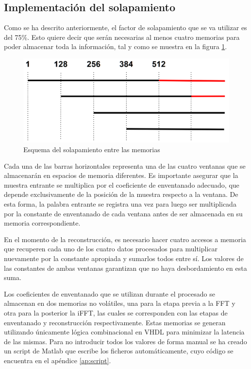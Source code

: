 \subsection{Implementación del solapamiento}
Como se ha descrito anteriormente, el factor de solapamiento que se va utilizar es del 75\%. Esto quiere decir que serán necesarias al menos cuatro memorias para poder almacenar toda la información, tal y como se muestra en la figura \ref{fig:solap}. 

\begin{figure}[!b]
\begin{center}
\includegraphics[width=13cm]{img/solap.png}
\caption{\label{fig:solap}Esquema del solapamiento entre las memorias}
\end{center}
\end{figure}

Cada una de las barras horizontales representa una de las cuatro ventanas que se almacenarán en espacios de memoria diferentes. Es importante asegurar que la muestra entrante se multiplica por el coeficiente de enventanado adecuado, que depende exclusivamente de la posición de la muestra respecto a la ventana. De esta forma, la palabra entrante se registra una vez para luego ser multiplicada por la constante de enventanado de cada ventana antes de ser almacenada en su memoria correspondiente.

En el momento de la reconstrucción, es necesario hacer cuatro accesos a memoria que recuperen cada uno de los cuatro datos procesados para multiplicar nuevamente por la constante apropiada y sumarlos todos entre sí. Los valores de las constantes de ambas ventanas garantizan que no haya desbordamiento en esta suma.

Los coeficientes de enventanado que se utilizan durante el procesado se almacenan en dos memorias no volátiles, una para la etapa previa a la FFT y otra para la posterior la iFFT, las cuales se corresponden con las etapas de enventanado y reconstrucción respectivamente. Estas memorias se generan utilizando únicamente lógica combinacional en VHDL para minimizar la latencia de las mismas. Para no introducir todos los valores de forma manual se ha creado un script de Matlab que escribe los ficheros automáticamente, cuyo código se encuentra en el apéndice \ref{ap:script}.


